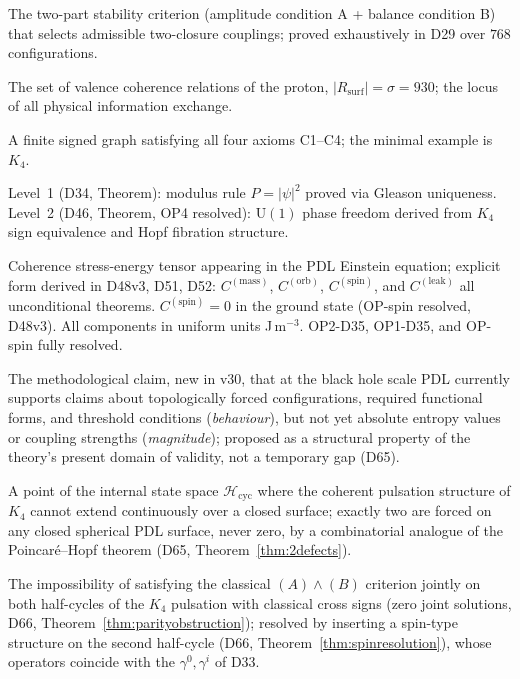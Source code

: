 \documentclass[11pt,a4paper]{article}
\theoremstyle{plain}
\theoremstyle{definition}
\theoremstyle{remark}
\newcommand{\Kfour}{K_4}
\newcommand{\Rsurf}{R_{\mathrm{surf}}}
\newcommand{\Ccoh}{C_{\mathrm{coh}}}
\begin{document}
\begin{description}[leftmargin=3.5cm, style=nextline]
\item[AB criterion] The two-part stability criterion (amplitude condition A + balance condition B) that selects admissible two-closure couplings; proved exhaustively in D29 over $768$ configurations.
\item[Active surface $\Rsurf$] The set of valence coherence relations of the proton, $|\Rsurf|=\sigma=930$; the locus of all physical information exchange.
\item[Admissible closure] A finite signed graph satisfying all four axioms C1--C4; the minimal example is $K_4$.
\item[Born Level~1 / Level~2] Level~1 (D34, Theorem): modulus rule $P=|\psi|^2$ proved via Gleason uniqueness. Level~2 (D46, Theorem, OP4 resolved): $\mathrm{U}(1)$ phase freedom derived from $K_4$ sign equivalence and Hopf fibration structure.
\item[$\Ccoh$] Coherence stress-energy tensor appearing in the PDL Einstein equation; explicit form derived in D48v3, D51, D52: $C^{(\mathrm{mass})}$, $C^{(\mathrm{orb})}$, $C^{(\mathrm{spin})}$, and $C^{(\mathrm{leak})}$ all unconditional theorems. $C^{(\mathrm{spin})}=0$ in the ground state (OP-spin resolved, D48v3). All components in uniform units J\,m$^{-3}$. OP2-D35, OP1-D35, and OP-spin fully resolved. 
\item[Behaviour-versus-magnitude principle] The methodological claim, new in v30, that at the black hole scale PDL currently supports claims about topologically forced configurations, required functional forms, and threshold conditions (\emph{behaviour}), but not yet absolute entropy values or coupling strengths (\emph{magnitude}); proposed as a structural property of the theory's present domain of validity, not a temporary gap (D65).
\item[Coherence defect] A point of the internal state space $\mathcal{H}_{\mathrm{cyc}}$ where the coherent pulsation structure of $\Kfour$ cannot extend continuously over a closed surface; exactly two are forced on any closed spherical PDL surface, never zero, by a combinatorial analogue of the Poincar\'e--Hopf theorem (D65, Theorem~\ref{thm:2defects}).
\item[Parity obstruction] The impossibility of satisfying the classical $(A)\wedge(B)$ criterion jointly on both half-cycles of the $K_4$ pulsation with classical cross signs (zero joint solutions, D66, Theorem~\ref{thm:parityobstruction}); resolved by inserting a spin-type structure on the second half-cycle (D66, Theorem~\ref{thm:spinresolution}), whose operators coincide with the $\gamma^0,\gamma^i$ of D33.

\end{description}
\end{document}
